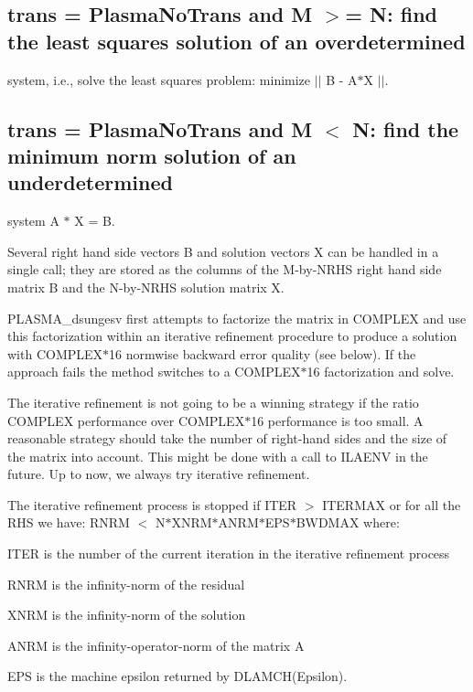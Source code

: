 \subsection*{trans = Plasma\+No\+Trans and M $>$= N\+: find the least squares solution of an overdetermined}

system, i.\+e., solve the least squares problem\+: minimize $\vert$$\vert$ B -\/ A$\ast$\+X $\vert$$\vert$.

\subsection*{trans = Plasma\+No\+Trans and M $<$ N\+: find the minimum norm solution of an underdetermined}

system A $\ast$ X = B.

Several right hand side vectors B and solution vectors X can be handled in a single call; they are stored as the columns of the M-\/by-\/\+N\+R\+H\+S right hand side matrix B and the N-\/by-\/\+N\+R\+H\+S solution matrix X.

P\+L\+A\+S\+M\+A\+\_\+dsungesv first attempts to factorize the matrix in C\+O\+M\+P\+L\+E\+X and use this factorization within an iterative refinement procedure to produce a solution with C\+O\+M\+P\+L\+E\+X$\ast$16 normwise backward error quality (see below). If the approach fails the method switches to a C\+O\+M\+P\+L\+E\+X$\ast$16 factorization and solve.

The iterative refinement is not going to be a winning strategy if the ratio C\+O\+M\+P\+L\+E\+X performance over C\+O\+M\+P\+L\+E\+X$\ast$16 performance is too small. A reasonable strategy should take the number of right-\/hand sides and the size of the matrix into account. This might be done with a call to I\+L\+A\+E\+N\+V in the future. Up to now, we always try iterative refinement.

The iterative refinement process is stopped if I\+T\+E\+R $>$ I\+T\+E\+R\+M\+A\+X or for all the R\+H\+S we have\+: R\+N\+R\+M $<$ N$\ast$\+X\+N\+R\+M$\ast$\+A\+N\+R\+M$\ast$\+E\+P\+S$\ast$\+B\+W\+D\+M\+A\+X where\+:


\begin{DoxyItemize}
\item I\+T\+E\+R is the number of the current iteration in the iterative refinement process
\item R\+N\+R\+M is the infinity-\/norm of the residual
\item X\+N\+R\+M is the infinity-\/norm of the solution
\item A\+N\+R\+M is the infinity-\/operator-\/norm of the matrix A
\item E\+P\+S is the machine epsilon returned by D\+L\+A\+M\+C\+H(\textquotesingle{}Epsilon\textquotesingle{}).
\end{DoxyItemize}

